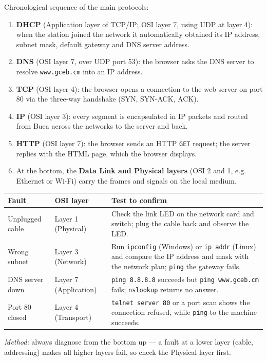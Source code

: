 \documentclass[11pt]{article}
\begin{document}
\begin{corrige}
Chronological sequence of the main protocols:
\begin{enumerate}
\item \textbf{DHCP} (Application layer of TCP/IP; OSI layer 7, using UDP at layer 4): when the station joined the network it automatically obtained its IP address, subnet mask, default gateway and DNS server address.
\item \textbf{DNS} (OSI layer 7, over UDP port 53): the browser asks the DNS server to resolve \texttt{www.gceb.cm} into an IP address.
\item \textbf{TCP} (OSI layer 4): the browser opens a connection to the web server on port 80 via the three-way handshake (SYN, SYN-ACK, ACK).
\item \textbf{IP} (OSI layer 3): every segment is encapsulated in IP packets and routed from Buea across the networks to the server and back.
\item \textbf{HTTP} (OSI layer 7): the browser sends an HTTP \texttt{GET} request; the server replies with the HTML page, which the browser displays.
\item At the bottom, the \textbf{Data Link and Physical layers} (OSI 2 and 1, e.g. Ethernet or Wi-Fi) carry the frames and signals on the local medium.
\end{enumerate}
\end{corrige}

\begin{corrige}
\begin{center}
\begin{tabularx}{\linewidth}{|X|l|X|}
\hline
\rowcolor{popblueL} \textbf{Fault} & \textbf{OSI layer} & \textbf{Test to confirm} \\
\hline
Unplugged cable & Layer 1 (Physical) & Check the link LED on the network card and switch; plug the cable back and observe the LED. \\
\hline
Wrong subnet & Layer 3 (Network) & Run \texttt{ipconfig} (Windows) or \texttt{ip addr} (Linux) and compare the IP address and mask with the network plan; \texttt{ping} the gateway fails. \\
\hline
DNS server down & Layer 7 (Application) & \texttt{ping 8.8.8.8} succeeds but \texttt{ping www.gceb.cm} fails; \texttt{nslookup} returns no answer. \\
\hline
Port 80 closed & Layer 4 (Transport) & \texttt{telnet server 80} or a port scan shows the connection refused, while \texttt{ping} to the machine succeeds. \\
\hline
\end{tabularx}
\end{center}
\emph{Method:} always diagnose from the bottom up — a fault at a lower layer (cable, addressing) makes all higher layers fail, so check the Physical layer first.
\end{corrige}
\end{document}
